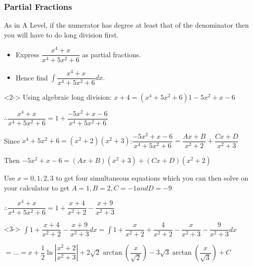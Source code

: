 \documentclass{beamer}
\begin{document}
	
	\begin{frame}[shrink=50]
		\frametitle{Partial Fractions}
		\alert{As in A Level, if the numerator has degree at least that of the denominator then you will have to do long division first.}
		
		\begin{problem}
			\begin{itemize}
				\item Express $\dfrac{x^{4}+x}{x^{4}+5x^{2}+6}$ as partial fractions.
				\item Hence find $\int \dfrac{x^{4}+x}{x^{4}+5x^{2}+6}dx.$
			\end{itemize}
		\end{problem}
		
		\begin{solution}<2->
			Using algebraic long division: $x+4 = (x^{4}+5x^{2}+6)1 -5x^{2}+x-6$
			
			$\therefore \dfrac{x^{4}+x}{x^{4}+5x^{2}+6}=1+\dfrac{-5x^{2}+x-6}{x^{4}+5x^{2}+6}$
			
			Since $x^{4}+5x^{2}+6 = (x^{2}+2)(x^{2}+3)$:$\dfrac{-5x^{2}+x-6}{x^{4}+5x^{2}+6} = \dfrac{Ax+B}{x^{2}+2}+\dfrac{Cx+D}{x^{2}+3}$
			
			Then $-5x^{2}+x-6 = (Ax+B)(x^{2}+3)+(Cx+D)(x^{2}+2)$
			
			Use $x=0,1,2,3$ to get four simultaneous equations which you can then solve on your calculator to get $A=1, B=2, C=-1 and D=-9$
			
			$\therefore \dfrac{x^{4}+x}{x^{4}+5x^{2}+6} = 1+\dfrac{x+4}{x^{2}+2}-\dfrac{x+9}{x^{2}+3}$
		\end{solution}
		
		\begin{solution}<3->
			$\int 1+\dfrac{x+4}{x^{2}+2}-\dfrac{x+9}{x^{2}+3}dx= \int 1+\dfrac{x}{x^{2}+2}+\dfrac{4}{x^{2}+2}-\dfrac{x}{x^{2}+3}-\dfrac{9}{x^{2}+3}dx$
			
			$=\ldots =x+\dfrac{1}{2}\ln \left| \dfrac{x^{2}+2}{x^{2}+3}\right| +2\sqrt{2}\arctan \left( \dfrac{x}{\sqrt{2}}\right) -3\sqrt{3}\arctan \left( \dfrac{x}{\sqrt{3}}\right) +C $
		\end{solution}
	\end{frame}
	
\end{document}
